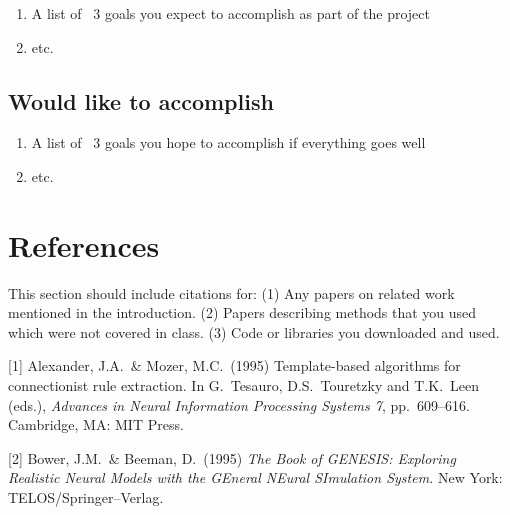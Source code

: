\documentclass{article}
\begin{document}
\begin{enumerate}
    \item A list of ~3 goals you expect to accomplish as part of the project
    \item etc.
\end{enumerate}

\subsection{Would like to accomplish}

\begin{enumerate}
    \item A list of ~3 goals you hope to accomplish if everything goes well
    \item etc.
\end{enumerate}

\section*{References}
This section should include citations for: (1) Any papers on related work mentioned in the introduction.
(2) Papers describing methods that you used which were not covered in class.
(3) Code or libraries you downloaded and used.

\medskip
\small
[1] Alexander, J.A.\ \& Mozer, M.C.\ (1995) Template-based algorithms
for connectionist rule extraction. In G.\ Tesauro, D.S.\ Touretzky and
T.K.\ Leen (eds.), {\it Advances in Neural Information Processing
  Systems 7}, pp.\ 609--616. Cambridge, MA: MIT Press.

[2] Bower, J.M.\ \& Beeman, D.\ (1995) {\it The Book of GENESIS:
  Exploring Realistic Neural Models with the GEneral NEural SImulation
  System.}  New York: TELOS/Springer--Verlag.
\end{document}
